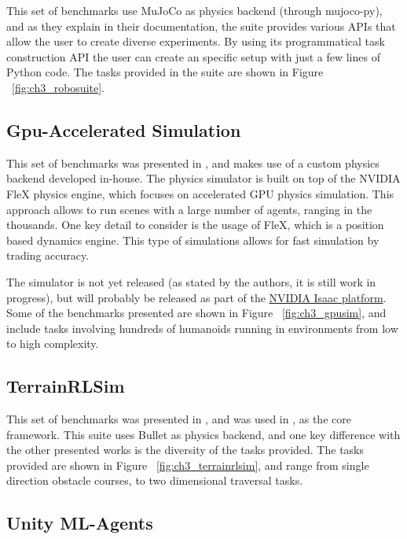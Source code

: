 This set of benchmarks use MuJoCo as physics backend (through mujoco-py), and as they
explain in their documentation, the suite provides various APIs that allow the user
to create diverse experiments. By using its programmatical task construction API
the user can create an specific setup with just a few lines of Python code.
The tasks provided in the suite are shown in Figure ~\ref{fig:ch3_robosuite}.

\figBenchmarksRobosuite

\subsection{Gpu-Accelerated Simulation}

This set of benchmarks was presented in \cite{GpuSim}, and makes use of a custom 
physics backend developed in-house. The physics simulator is built on top of the 
NVIDIA FleX physics engine, which focuses on accelerated GPU physics simulation. 
This approach allows to run scenes with a large number of agents, ranging in the 
thousands. One key detail to consider is the usage of FleX, which is a position 
based dynamics engine. This type of simulations allows for fast simulation by trading
accuracy. 

The simulator is not yet released (as stated by the authors, it is still 
work in progress), but will probably be released as part of the 
\href{https://developer.nvidia.com/isaac-sdk}{NVIDIA Isaac platform}. Some of the 
benchmarks presented are shown in Figure ~\ref{fig:ch3_gpusim}, and include tasks
involving hundreds of humanoids running in environments from low to high complexity.

\figBenchmarksGpuSim

\subsection{TerrainRLSim}

This set of benchmarks was presented in \cite{TerrainRLSim}, and was used in \cite{DeepTerrainRL}, 
\cite{ActuationChoice} as the core framework. This suite uses Bullet as physics backend,
and one key difference with the other presented works is the diversity of the tasks provided.
The tasks provided are shown in Figure ~\ref{fig:ch3_terrainrlsim}, and range from 
single direction obstacle courses, to two dimensional traversal tasks.

\figBenchmarksTerrainRLSim

\subsection{Unity ML-Agents}

